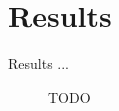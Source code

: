 \section{Results}

Results ...

\begin{figure*}[t]
	\centering
	
	\caption{TODO}
	\label{fig:subfig}
\end{figure*}